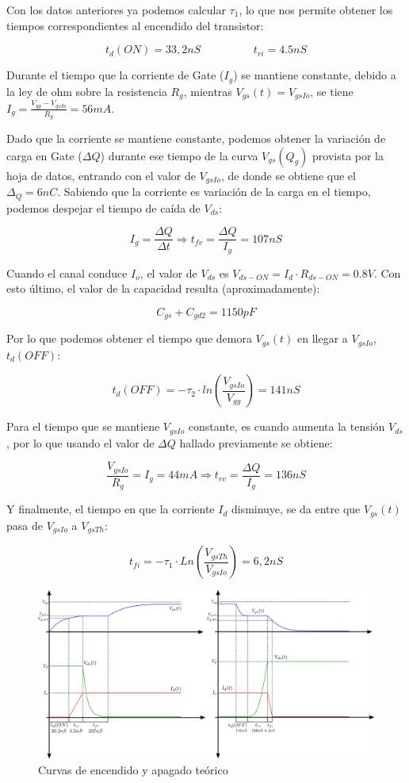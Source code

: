 \documentclass[e4_tp1_main.tex]{subfiles}
\begin{document}
Con los datos anteriores ya podemos calcular $\tau_1$, lo que nos permite obtener los tiempos correspondientes al encendido del transistor:

\[
t_d(ON) = 33,2nS \hspace{2cm} t_{ri} = 4.5nS
\]

Durante el tiempo que la corriente de Gate ($I_g$) se mantiene constante, debido a la ley de ohm sobre la resistencia $R_g$, mientras $V_{gs}(t) = V_{gsIo}$, se tiene $I_g = \frac{V_{gg} - V_{gsIo}}{R_g} = 56mA$.
 

Dado que la corriente se mantiene constante, podemos obtener la variación de carga en Gate ($\Delta Q$) durante ese tiempo de la curva $V_{gs}(Q_g)$ provista por la hoja de datos, entrando con el valor de $V_{gsIo}$, de donde se obtiene que el $\Delta_Q = 6nC$. Sabiendo que la corriente es variación de la carga en el tiempo, podemos despejar el tiempo de caída de $V_{ds}$:

\[
I_g = \frac{\Delta Q}{\Delta t} \Longrightarrow t_{fv} = \frac{\Delta Q}{I_g} = 107nS
\]


Cuando el canal conduce $I_o$, el valor de $V_{ds}$ es $V_{ds-ON} = I_d \cdot R_{ds-ON} = 0.8V$. Con esto último, el valor de la capacidad resulta (aproximadamente):

\[
C_{gs} + C_{gd2} = 1150pF
\]

Por lo que podemos obtener el tiempo que demora $V_{gs}(t)$ en llegar a $V_{gsIo}$, $t_d(OFF)$:

\[
t_d(OFF) = -\tau_2 \cdot ln\left( \frac{V_{gsIo}}{V_{gg}} \right) = 141nS
\]

Para el tiempo que se mantiene $V_{gsIo}$ constante, es cuando aumenta la tensión $V_{ds}$, por lo que usando el valor de $\Delta Q$ hallado previamente se obtiene:

\[
\frac{V_{gsIo}}{R_g} = I_g = 44mA \Longrightarrow t_{rv} = \frac{\Delta Q}{I_g} = 136nS
\]

Y finalmente, el tiempo en que la corriente $I_d$ disminuye, se da entre que $V_{gs}(t)$ pasa de $V_{gsIo}$ a $V_{gsTh}$:

\[
t_{fi} = -\tau_1 \cdot Ln \left( \frac{V_{gsTh}}{V_{gsIo}}\right) = 6,2nS
\]

\begin{figure}[H]
\centering
\includegraphics[width=1\linewidth]{Imagenes/Punto1/EncendidoApagadoTeorico.png}
\caption{Curvas de encendido y apagado teórico}
\end{figure}
 
\end{document}
